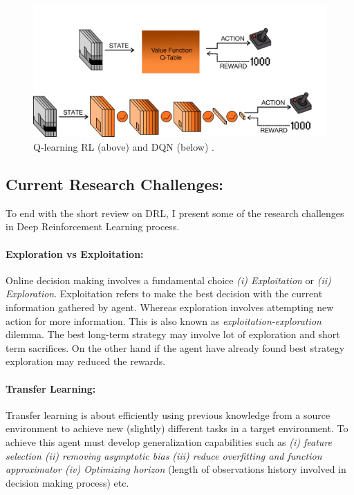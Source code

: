 \begin{figure}[t]
	\includegraphics[width=0.95\linewidth ]{fig/dqn.png}
    \vspace{-2mm}
    \caption{Q-learning RL (above) and DQN (below) \cite{mnih2015human}.}
    \label{fig:dqn}
\end{figure}

\subsection{Current Research Challenges:}
To end with the short review on DRL, I present some of the research challenges in Deep Reinforcement Learning process.
\paragraph{Exploration vs Exploitation:}
Online decision making involves a fundamental choice {\em (i) Exploitation} or {\em (ii) Exploration}. Exploitation refers to make the best decision with the current information gathered by agent. Whereas exploration involves attempting new action for more information. This is also known as {\em exploitation-exploration} dilemma. The best long-term strategy may involve lot of exploration and short term sacrifices. On the other hand if the agent have already found best strategy exploration may reduced the rewards.

\paragraph{Transfer Learning:}
Transfer learning is about efficiently using previous knowledge from a
source environment to achieve new (slightly) different tasks in a target environment. To achieve this agent must develop generalization capabilities such as {\em (i) feature selection (ii) removing asymptotic bias (iii) reduce overfitting and function approximator (iv) Optimizing horizon} (length of observations history involved in decision making process) etc.

